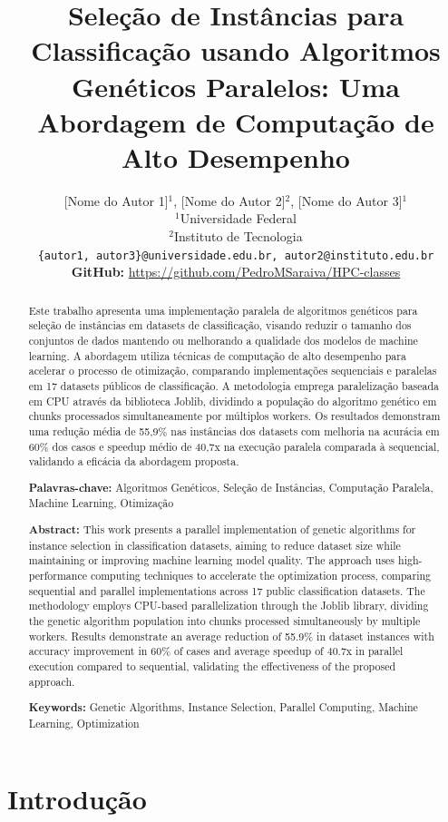 \documentclass[12pt,a4paper]{article}
\title{\textbf{Seleção de Instâncias para Classificação usando Algoritmos Genéticos Paralelos: Uma Abordagem de Computação de Alto Desempenho}}
\author{
[Nome do Autor 1]$^1$, [Nome do Autor 2]$^2$, [Nome do Autor 3]$^1$ \\
$^1$Universidade Federal \\
$^2$Instituto de Tecnologia \\
\texttt{\{autor1, autor3\}@universidade.edu.br, autor2@instituto.edu.br} \\
\textbf{GitHub:} \url{https://github.com/PedroMSaraiva/HPC-classes}
}
\date{}
\begin{document}
\maketitle

\begin{abstract}
Este trabalho apresenta uma implementação paralela de algoritmos genéticos para seleção de instâncias em datasets de classificação, visando reduzir o tamanho dos conjuntos de dados mantendo ou melhorando a qualidade dos modelos de machine learning. A abordagem utiliza técnicas de computação de alto desempenho para acelerar o processo de otimização, comparando implementações sequenciais e paralelas em 17 datasets públicos de classificação. A metodologia emprega paralelização baseada em CPU através da biblioteca Joblib, dividindo a população do algoritmo genético em chunks processados simultaneamente por múltiplos workers. Os resultados demonstram uma redução média de 55,9\% nas instâncias dos datasets com melhoria na acurácia em 60\% dos casos e speedup médio de 40,7x na execução paralela comparada à sequencial, validando a eficácia da abordagem proposta.

\textbf{Palavras-chave:} Algoritmos Genéticos, Seleção de Instâncias, Computação Paralela, Machine Learning, Otimização
\end{abstract}

\begin{abstract}
\textbf{Abstract:} This work presents a parallel implementation of genetic algorithms for instance selection in classification datasets, aiming to reduce dataset size while maintaining or improving machine learning model quality. The approach uses high-performance computing techniques to accelerate the optimization process, comparing sequential and parallel implementations across 17 public classification datasets. The methodology employs CPU-based parallelization through the Joblib library, dividing the genetic algorithm population into chunks processed simultaneously by multiple workers. Results demonstrate an average reduction of 55.9\% in dataset instances with accuracy improvement in 60\% of cases and average speedup of 40.7x in parallel execution compared to sequential, validating the effectiveness of the proposed approach.

\textbf{Keywords:} Genetic Algorithms, Instance Selection, Parallel Computing, Machine Learning, Optimization
\end{abstract}

\section{Introdução}
\end{document}

